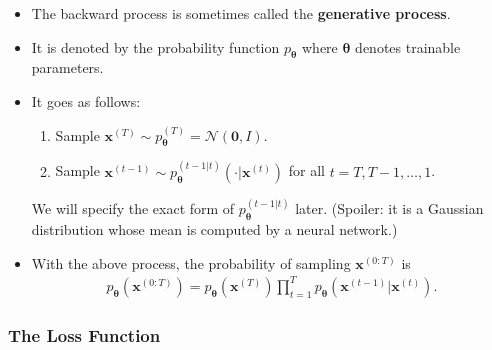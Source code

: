 \documentclass[10pt]{article}
\newcommand{\ve}[1]{\mathbf{#1}}
\newcommand{\ves}[1]{\boldsymbol{#1}}
\newcommand{\mcal}[1]{\mathcal{#1}}
\begin{document}
\begin{itemize}
  \item The backward process is sometimes called the {\bf generative process}.
  
  \item It is denoted by the probability function $p_{\ves{\theta}}$ where $\ves{\theta}$ denotes trainable parameters. 
  
  \item It goes as follows:
  \begin{enumerate}
    \item Sample $\ve{x}^{(T)} \sim p_{\ves{\theta}}^{(T)} = \mcal{N}(\ve{0},I)$.
    \item Sample $\ve{x}^{(t-1)} \sim p_{\ves{\theta}}^{(t-1|t)}(\cdot|\ve{x}^{(t)})$ for all $t = T, T-1, \dotsc, 1$.
  \end{enumerate}
  We will specify the exact form of $p_\mathbf{\ves{\theta}}^{(t-1|t)}$ later. (Spoiler: it is a Gaussian distribution whose mean is computed by a neural network.)
  
  \item With the above process, the probability of sampling $\ve{x}^{(0:T)}$ is
  \begin{align*}
    p_{\ves{\theta}}(\ve{x}^{(0:T)}) = p_{\ves{\theta}}(\ve{x}^{(T)}) \prod_{t=1}^T p_{\ves{\theta}}(\ve{x}^{(t-1)}|\ve{x}^{(t)}).
  \end{align*}
\end{itemize}

\subsubsection{The Loss Function}
\end{document}
